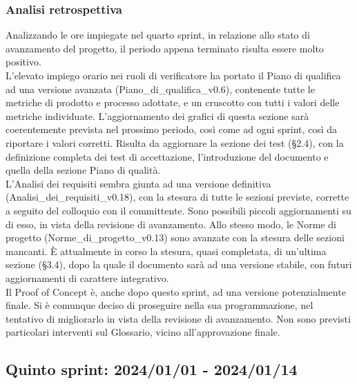 \newpage
\subsubsection{Analisi retrospettiva}
Analizzando le ore impiegate nel quarto sprint, in relazione allo stato di avanzamento del progetto, il periodo appena terminato risulta essere molto positivo.\\
L'elevato impiego orario nei ruoli di verificatore ha portato il Piano di qualifica ad una versione avanzata (Piano\_di\_qualifica\_v0.6), contenente tutte le metriche di prodotto e processo adottate, e un cruscotto con tutti i valori delle metriche individuate. L'aggiornamento dei grafici di questa sezione sarà coerentemente prevista nel prossimo periodo, così come ad ogni sprint, così da riportare i valori corretti. Risulta da aggiornare la sezione dei test (§2.4), con la definizione completa dei test di accettazione, l'introduzione del documento e quella della sezione Piano di qualità.\\
L'Analisi dei requisiti sembra giunta ad una versione definitiva (Analisi\_dei\_requisiti\_v0.18), con la stesura di tutte le sezioni previste, corrette a seguito del colloquio con il committente. Sono possibili piccoli aggiornamenti su di esso, in vista della revisione di avanzamento. Allo stesso modo, le Norme di progetto (Norme\_di\_progetto\_v0.13) sono avanzate con la stesura delle sezioni mancanti. È attualmente in corso la stesura, quasi completata, di un'ultima sezione (§3.4), dopo la quale il documento sarà ad una versione stabile, con futuri aggiornamenti di carattere integrativo.\\
Il Proof of Concept è, anche dopo questo sprint, ad una versione potenzialmente finale. Si è comunque deciso di proseguire nella sua programmazione, nel tentativo di migliorarlo in vista della revisione di avanzamento.
Non sono previsti particolari interventi sul Glossario, vicino all'approvazione finale.
\newpage


\subsection{Quinto sprint: 2024/01/01 - 2024/01/14}

